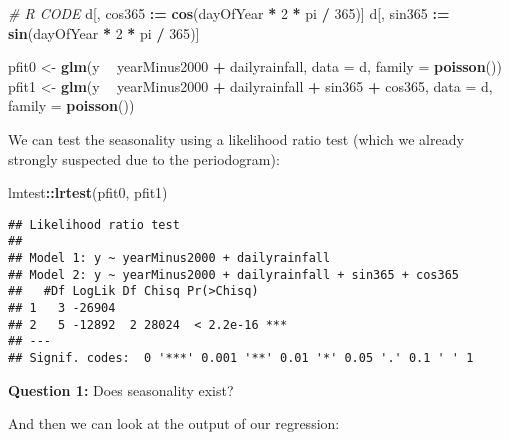 \documentclass[]{book}
\newenvironment{Shaded}{\begin{snugshade}}{\end{snugshade}}
\newcommand{\KeywordTok}[1]{\textcolor[rgb]{0.13,0.29,0.53}{\textbf{#1}}}
\newcommand{\DataTypeTok}[1]{\textcolor[rgb]{0.13,0.29,0.53}{#1}}
\newcommand{\DecValTok}[1]{\textcolor[rgb]{0.00,0.00,0.81}{#1}}
\newcommand{\StringTok}[1]{\textcolor[rgb]{0.31,0.60,0.02}{#1}}
\newcommand{\CommentTok}[1]{\textcolor[rgb]{0.56,0.35,0.01}{\textit{#1}}}
\newcommand{\OperatorTok}[1]{\textcolor[rgb]{0.81,0.36,0.00}{\textbf{#1}}}
\newcommand{\ErrorTok}[1]{\textcolor[rgb]{0.64,0.00,0.00}{\textbf{#1}}}
\newcommand{\NormalTok}[1]{#1}
\begin{document}
\begin{Shaded}
\begin{Highlighting}[]
\CommentTok{# R CODE}
\NormalTok{d[, cos365 }\OperatorTok{:}\ErrorTok{=}\StringTok{ }\KeywordTok{cos}\NormalTok{(dayOfYear }\OperatorTok{*}\StringTok{ }\DecValTok{2} \OperatorTok{*}\StringTok{ }\NormalTok{pi }\OperatorTok{/}\StringTok{ }\DecValTok{365}\NormalTok{)]}
\NormalTok{d[, sin365 }\OperatorTok{:}\ErrorTok{=}\StringTok{ }\KeywordTok{sin}\NormalTok{(dayOfYear }\OperatorTok{*}\StringTok{ }\DecValTok{2} \OperatorTok{*}\StringTok{ }\NormalTok{pi }\OperatorTok{/}\StringTok{ }\DecValTok{365}\NormalTok{)]}

\NormalTok{pfit0 <-}\StringTok{ }\KeywordTok{glm}\NormalTok{(y }\OperatorTok{~}\StringTok{ }\NormalTok{yearMinus2000 }\OperatorTok{+}\StringTok{ }\NormalTok{dailyrainfall, }\DataTypeTok{data =}\NormalTok{ d, }\DataTypeTok{family =} \KeywordTok{poisson}\NormalTok{())}
\NormalTok{pfit1 <-}\StringTok{ }\KeywordTok{glm}\NormalTok{(y }\OperatorTok{~}\StringTok{ }\NormalTok{yearMinus2000 }\OperatorTok{+}\StringTok{ }\NormalTok{dailyrainfall }\OperatorTok{+}\StringTok{ }\NormalTok{sin365 }\OperatorTok{+}\StringTok{ }\NormalTok{cos365, }\DataTypeTok{data =}\NormalTok{ d, }\DataTypeTok{family =} \KeywordTok{poisson}\NormalTok{())}
\end{Highlighting}
\end{Shaded}

We can test the seasonality using a likelihood ratio test (which we
already strongly suspected due to the periodogram):

\begin{Shaded}
\begin{Highlighting}[]
\NormalTok{lmtest}\OperatorTok{::}\KeywordTok{lrtest}\NormalTok{(pfit0, pfit1)}
\end{Highlighting}
\end{Shaded}

\begin{verbatim}
## Likelihood ratio test
## 
## Model 1: y ~ yearMinus2000 + dailyrainfall
## Model 2: y ~ yearMinus2000 + dailyrainfall + sin365 + cos365
##   #Df LogLik Df Chisq Pr(>Chisq)    
## 1   3 -26904                        
## 2   5 -12892  2 28024  < 2.2e-16 ***
## ---
## Signif. codes:  0 '***' 0.001 '**' 0.01 '*' 0.05 '.' 0.1 ' ' 1
\end{verbatim}

\textbf{Question 1:} Does seasonality exist?

And then we can look at the output of our regression:
\end{document}
